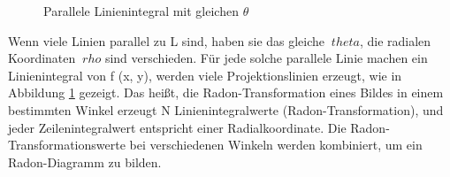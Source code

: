 \begin{figure}[H]
\begin{minipage}[b]{0.49\textwidth}
\caption{Parallele Linienintegral mit gleichen $ \theta $}
\label{fig:Parallele Linienintegral}
\end{minipage}
\end{figure}

Wenn viele Linien parallel zu L sind, haben sie das gleiche $ \ theta $, die radialen Koordinaten $ \ rho $ sind verschieden. Für jede solche parallele Linie machen ein Linienintegral von f (x, y), werden viele Projektionslinien erzeugt, wie in Abbildung \ref{fig:Parallele Linienintegral} gezeigt. Das heißt, die Radon-Transformation eines Bildes in einem bestimmten Winkel erzeugt N Linienintegralwerte (Radon-Transformation), und jeder Zeilenintegralwert entspricht einer Radialkoordinate. Die Radon-Transformationswerte bei verschiedenen Winkeln werden kombiniert, um ein Radon-Diagramm zu bilden.

